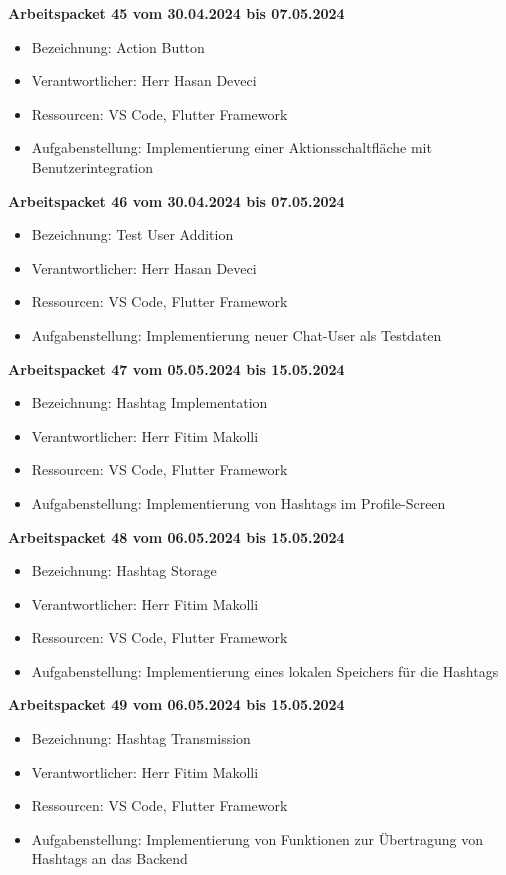\textbf{Arbeitspacket 45 vom 30.04.2024 bis 07.05.2024}
\begin{itemize}[itemsep=0pt]
    \item{Bezeichnung: Action Button} 
	\item{Verantwortlicher: Herr Hasan Deveci} 
	\item{Ressourcen: VS Code, Flutter Framework} 
    \item{Aufgabenstellung: Implementierung einer Aktionsschaltfläche mit Benutzerintegration}
\end{itemize} 

\textbf{Arbeitspacket 46 vom 30.04.2024 bis 07.05.2024}
\begin{itemize}[itemsep=0pt]
    \item{Bezeichnung: Test User Addition} 
	\item{Verantwortlicher: Herr Hasan Deveci} 
	\item{Ressourcen: VS Code, Flutter Framework} 
    \item{Aufgabenstellung: Implementierung neuer Chat-User als Testdaten}
\end{itemize} 

\textbf{Arbeitspacket 47 vom 05.05.2024 bis 15.05.2024}
\begin{itemize}[itemsep=0pt]
    \item{Bezeichnung: Hashtag Implementation} 
	\item{Verantwortlicher: Herr Fitim Makolli} 
	\item{Ressourcen: VS Code, Flutter Framework} 
    \item{Aufgabenstellung: Implementierung von Hashtags im Profile-Screen}
\end{itemize} 

\textbf{Arbeitspacket 48 vom 06.05.2024 bis 15.05.2024}
\begin{itemize}[itemsep=0pt]
    \item{Bezeichnung: Hashtag Storage} 
	\item{Verantwortlicher: Herr Fitim Makolli} 
	\item{Ressourcen: VS Code, Flutter Framework} 
    \item{Aufgabenstellung: Implementierung eines lokalen Speichers für die Hashtags}
\end{itemize} 

\textbf{Arbeitspacket 49 vom 06.05.2024 bis 15.05.2024}
\begin{itemize}[itemsep=0pt]
    \item{Bezeichnung: Hashtag Transmission} 
	\item{Verantwortlicher: Herr Fitim Makolli} 
	\item{Ressourcen: VS Code, Flutter Framework} 
    \item{Aufgabenstellung: Implementierung von Funktionen zur Übertragung von Hashtags an das Backend}
\end{itemize} 


